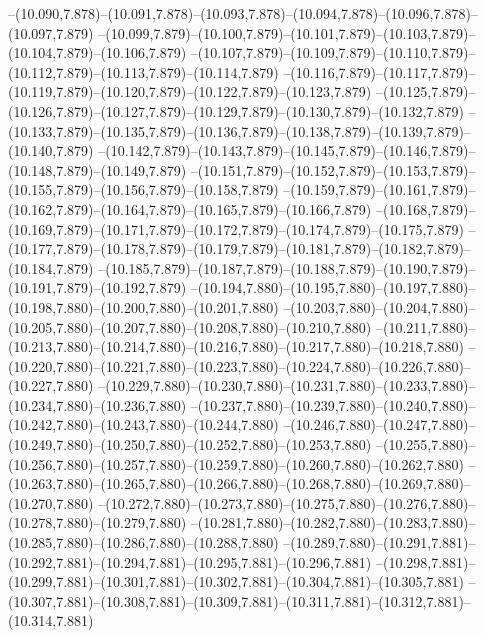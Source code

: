   --(10.090,7.878)--(10.091,7.878)--(10.093,7.878)--(10.094,7.878)--(10.096,7.878)--(10.097,7.879)%
  --(10.099,7.879)--(10.100,7.879)--(10.101,7.879)--(10.103,7.879)--(10.104,7.879)--(10.106,7.879)%
  --(10.107,7.879)--(10.109,7.879)--(10.110,7.879)--(10.112,7.879)--(10.113,7.879)--(10.114,7.879)%
  --(10.116,7.879)--(10.117,7.879)--(10.119,7.879)--(10.120,7.879)--(10.122,7.879)--(10.123,7.879)%
  --(10.125,7.879)--(10.126,7.879)--(10.127,7.879)--(10.129,7.879)--(10.130,7.879)--(10.132,7.879)%
  --(10.133,7.879)--(10.135,7.879)--(10.136,7.879)--(10.138,7.879)--(10.139,7.879)--(10.140,7.879)%
  --(10.142,7.879)--(10.143,7.879)--(10.145,7.879)--(10.146,7.879)--(10.148,7.879)--(10.149,7.879)%
  --(10.151,7.879)--(10.152,7.879)--(10.153,7.879)--(10.155,7.879)--(10.156,7.879)--(10.158,7.879)%
  --(10.159,7.879)--(10.161,7.879)--(10.162,7.879)--(10.164,7.879)--(10.165,7.879)--(10.166,7.879)%
  --(10.168,7.879)--(10.169,7.879)--(10.171,7.879)--(10.172,7.879)--(10.174,7.879)--(10.175,7.879)%
  --(10.177,7.879)--(10.178,7.879)--(10.179,7.879)--(10.181,7.879)--(10.182,7.879)--(10.184,7.879)%
  --(10.185,7.879)--(10.187,7.879)--(10.188,7.879)--(10.190,7.879)--(10.191,7.879)--(10.192,7.879)%
  --(10.194,7.880)--(10.195,7.880)--(10.197,7.880)--(10.198,7.880)--(10.200,7.880)--(10.201,7.880)%
  --(10.203,7.880)--(10.204,7.880)--(10.205,7.880)--(10.207,7.880)--(10.208,7.880)--(10.210,7.880)%
  --(10.211,7.880)--(10.213,7.880)--(10.214,7.880)--(10.216,7.880)--(10.217,7.880)--(10.218,7.880)%
  --(10.220,7.880)--(10.221,7.880)--(10.223,7.880)--(10.224,7.880)--(10.226,7.880)--(10.227,7.880)%
  --(10.229,7.880)--(10.230,7.880)--(10.231,7.880)--(10.233,7.880)--(10.234,7.880)--(10.236,7.880)%
  --(10.237,7.880)--(10.239,7.880)--(10.240,7.880)--(10.242,7.880)--(10.243,7.880)--(10.244,7.880)%
  --(10.246,7.880)--(10.247,7.880)--(10.249,7.880)--(10.250,7.880)--(10.252,7.880)--(10.253,7.880)%
  --(10.255,7.880)--(10.256,7.880)--(10.257,7.880)--(10.259,7.880)--(10.260,7.880)--(10.262,7.880)%
  --(10.263,7.880)--(10.265,7.880)--(10.266,7.880)--(10.268,7.880)--(10.269,7.880)--(10.270,7.880)%
  --(10.272,7.880)--(10.273,7.880)--(10.275,7.880)--(10.276,7.880)--(10.278,7.880)--(10.279,7.880)%
  --(10.281,7.880)--(10.282,7.880)--(10.283,7.880)--(10.285,7.880)--(10.286,7.880)--(10.288,7.880)%
  --(10.289,7.880)--(10.291,7.881)--(10.292,7.881)--(10.294,7.881)--(10.295,7.881)--(10.296,7.881)%
  --(10.298,7.881)--(10.299,7.881)--(10.301,7.881)--(10.302,7.881)--(10.304,7.881)--(10.305,7.881)%
  --(10.307,7.881)--(10.308,7.881)--(10.309,7.881)--(10.311,7.881)--(10.312,7.881)--(10.314,7.881)%
